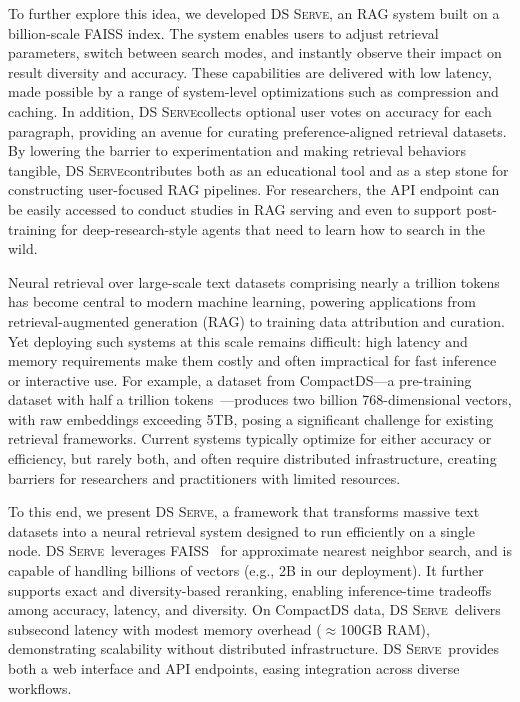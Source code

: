 \documentclass[letterpaper]{article} %
\newcommand{\sys}{\textsc{DS Serve\xspace}}%
\begin{document}
{To further explore this idea, we developed \sys, an RAG system built on a billion-scale FAISS\cite{faiss} index. The system enables users to adjust retrieval parameters, switch between search modes, and instantly observe their impact on result diversity and accuracy. These capabilities are delivered with low latency, made possible by a range of system-level optimizations such as compression and caching. In addition, \sys collects optional user votes on accuracy for each paragraph, providing an avenue for curating preference-aligned retrieval datasets. By lowering the barrier to experimentation and making retrieval behaviors tangible, \sys contributes both as an educational tool and as a step stone for constructing user-focused RAG pipelines. For researchers, the API endpoint can be easily accessed to conduct studies in RAG serving and even to support post-training for deep-research-style agents that need to learn how to search in the wild.}


Neural retrieval over large-scale text datasets comprising nearly a trillion tokens has become central to modern machine learning, powering applications from retrieval-augmented generation (RAG) to training data attribution and curation.
Yet deploying such systems at this scale remains difficult: high latency and memory requirements make them costly and often impractical for fast inference or interactive use. For example, a dataset from CompactDS---a pre-training dataset with half a trillion tokens~\cite{compactds}---produces two billion 768-dimensional vectors, with raw embeddings exceeding 5TB, posing a significant challenge for existing retrieval frameworks. Current systems typically optimize for either accuracy or efficiency, but rarely both, and often require distributed infrastructure, creating barriers for researchers and practitioners with limited resources.

To this end, we present \sys, a framework that transforms massive text datasets into a neural retrieval system designed to run efficiently on a single node. \sys\ leverages FAISS~\cite{faiss} for approximate nearest neighbor search, and is capable of handling billions of vectors (e.g., 2B in our deployment). It further supports exact and diversity-based reranking, enabling inference-time tradeoffs among accuracy, latency, and diversity.
On CompactDS data, \sys\ delivers subsecond latency with modest memory overhead ($\approx$100GB RAM), demonstrating scalability without distributed infrastructure. \sys\ provides both a web interface and API endpoints, easing integration across diverse workflows.
\end{document}

